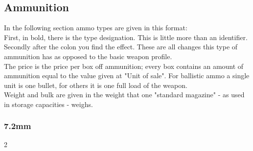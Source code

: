 \subsection{Ammunition}
In the following section ammo types are given in this format:\\
First, in bold, there is the type designation. This is little more than an identifier.\\
Secondly after the colon you find the effect. These are all changes this type of ammunition has as opposed to the basic weapon profile.\\
The price is the price per box off ammunition; every box contains an amount of ammunition equal to the value given at "Unit of sale". For ballistic ammo a single unit is one bullet, for others it is one full load of the weapon.\\
Weight and bulk are given in the weight that one "standard magazine" - as used in storage capacities - weighs.
\newcommand{\lastcaliber}{7.2mm}
\subsubsection{7.2mm}
\vspace{8mm}
\begin{multicols}{2}
\end{multicols}
